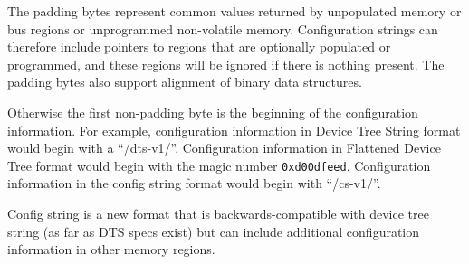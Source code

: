\begin{commentary}
The padding bytes represent common values returned by unpopulated
memory or bus regions or unprogrammed non-volatile
memory. Configuration strings can therefore include pointers to
regions that are optionally populated or programmed, and these regions
will be ignored if there is nothing present.  The padding bytes also
support alignment of binary data structures.
\end{commentary}

Otherwise the first non-padding byte is the beginning of the
configuration information.  For example, configuration information in
Device Tree String format would begin with a ``/dts-v1/''.
Configuration information in Flattened Device Tree format would begin
with the magic number {\tt 0xd00dfeed}.  Configuration information in
the config string format would begin with ``/cs-v1/''.
\begin{commentary}
  Config string is a new format that is backwards-compatible with
  device tree string (as far as DTS specs exist) but can include
  additional configuration information in other memory regions.
\end{commentary}

